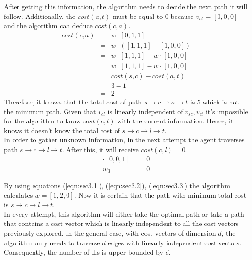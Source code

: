 After getting this information, the algorithm needs to decide the next path it will follow. Additionally, the $cost(a,t)$ must be equal to $0$ because $v_{at} = [0,0,0]$ and the algorithm can deduce $cost(c,a)$.
\begin{eqnarray*}
  cost(c,a) &=&  w \cdot [0,1,1] \\
  &=&  w \cdot ([1,1,1] - [1,0,0]) \\
  &=&  w \cdot [1,1,1] - w \cdot [1,0,0] \\
  &=&  w \cdot [1,1,1] - w \cdot [1,0,0] \\
  &=&  cost(s,c) - cost(a,t) \\
  &=&  3 - 1 \\
  &=&  2
\end{eqnarray*}
Therefore, it knows that the total cost of path $s \to c \to a \to t$ is $5$ which is not the minimum path.
Given that $v_{cl}$ is linearly independent of $v_{sc},v_{ct}$ it's impossible for the algorithm to know $cost(c,l)$ with the current information. Hence, it knows it doesn't know the total cost of $s \to c \to l \to t$. \\

In order to gather unknown information, in the next attempt the agent traverses path $s \to c \to l \to t$. After this, it will receive $cost(c,l) = 0$.
\begin{eqnarray}
  [w_1,w_2,w_3] \cdot [0,0,1] &=& 0 \nonumber\\
  w_3 &=& 0 \label{eqn:sec3.3}
\end{eqnarray}

By using equations (\ref{eqn:sec3.1}), (\ref{eqn:sec3.2}), (\ref{eqn:sec3.3}) the algorithm calculates $w=[1,2,0]$.
Now it is certain that the path with minimum total cost is $s \to c \to l \to t$. \\

In every attempt, this algorithm will either take the optimal path or take a path that contains a cost vector which is linearly independent to all the cost vectors previously explored. In the general case, with cost vectors of dimension $d$, the algorithm only needs to traverse $d$ edges with linearly independent cost vectors. Consequently, the number of $\bot$s is upper bounded by $d$.
